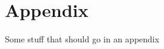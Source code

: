 

\chapter*{Appendix}\label{appendix}



\pagestyle{plain}

Some stuff that should go in an appendix

